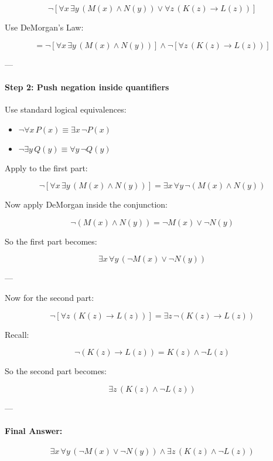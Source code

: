 \documentclass{article}
\begin{document}
\[
\neg \left[ \forall x \, \exists y \, (M(x) \land N(y)) \lor \forall z \, (K(z) \to L(z)) \right]
\]

Use DeMorgan's Law:

\[
= \neg \left[ \forall x \, \exists y \, (M(x) \land N(y)) \right] \land \neg \left[ \forall z \, (K(z) \to L(z)) \right]
\]

---

\paragraph{Step 2: Push negation inside quantifiers}

Use standard logical equivalences:

\begin{itemize}
  \item \( \neg \forall x \, P(x) \equiv \exists x \, \neg P(x) \)
  \item \( \neg \exists y \, Q(y) \equiv \forall y \, \neg Q(y) \)
\end{itemize}

Apply to the first part:

\[
\neg \left[ \forall x \, \exists y \, (M(x) \land N(y)) \right] = \exists x \, \forall y \, \neg (M(x) \land N(y))
\]

Now apply DeMorgan inside the conjunction:

\[
\neg (M(x) \land N(y)) = \neg M(x) \lor \neg N(y)
\]

So the first part becomes:

\[
\exists x \, \forall y \, (\neg M(x) \lor \neg N(y))
\]

---

Now for the second part:

\[
\neg \left[ \forall z \, (K(z) \to L(z)) \right] = \exists z \, \neg (K(z) \to L(z))
\]

Recall:

\[
\neg (K(z) \to L(z)) = K(z) \land \neg L(z)
\]

So the second part becomes:

\[
\exists z \, (K(z) \land \neg L(z))
\]

---

\paragraph{Final Answer:}

\[
\boxed{
\exists x \, \forall y \, (\neg M(x) \lor \neg N(y)) \land \exists z \, (K(z) \land \neg L(z))
}
\]
\end{document}
